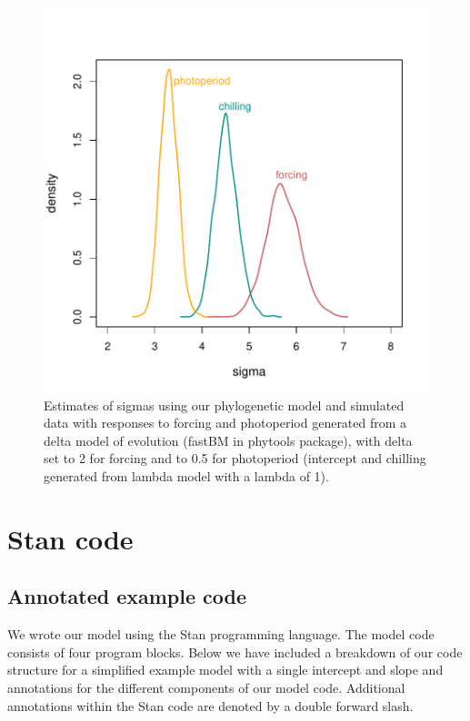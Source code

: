 \documentclass[11pt]{article}
\begin{document}
\clearpage
\begin{figure}
  \begin{center}
  \includegraphics[width=14cm]{../../analyses/phylogeny/figures/burstmodelfigquick.pdf}
  \caption{Estimates of sigmas using our phylogenetic model and simulated data with responses to forcing and photoperiod generated from a delta model of evolution (fastBM in phytools package), with delta set to 2 for forcing and to 0.5 for photoperiod (intercept and chilling generated from lambda model with a lambda of 1).}
  \label{fig:burstmodels}
  \end{center}
\end{figure}



\clearpage
\section*{Stan code}

\subsection*{Annotated example code}
We wrote our model using the Stan programming language. The model code consists of four program blocks. Below we have included a breakdown of our code structure for a simplified example model with a single intercept and slope and annotations for the different components of our model code. Additional annotations within the Stan code are denoted by a double forward slash.\\
\end{document}
